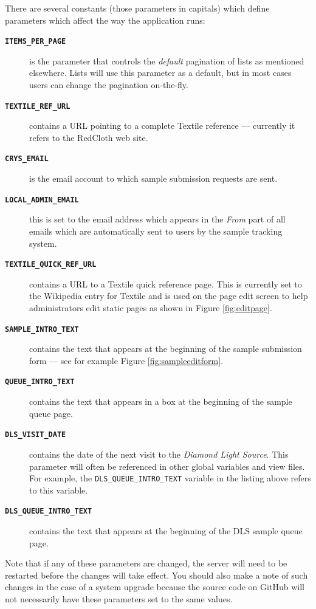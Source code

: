 \documentclass[12pt,twoside]{article}
\begin{document}
There are several constants (those parameters in capitals) which define
parameters which affect the way the application runs:
\begin{description}
\item[\texttt{\textbf{ITEMS\_PER\_PAGE}}]
is the parameter that controls the \emph{default} pagination of lists
as mentioned elsewhere. Lists will use this parameter as a default, but
in most cases users can change the pagination on-the-fly.
\item[\texttt{\textbf{TEXTILE\_REF\_URL}}]
contains a URL pointing to a complete Textile reference --- currently
it refers to the RedCloth web site.
\item[\texttt{\textbf{CRYS\_EMAIL}}]
is the email account to which sample submission requests are sent.
\item[\texttt{\textbf{LOCAL\_ADMIN\_EMAIL}}]
this is set to the email address which appears in the \emph{From}
part of all emails which are automatically sent to users by the sample
tracking system.
\item[\texttt{\textbf{TEXTILE\_QUICK\_REF\_URL}}]
contains a URL to a Textile quick reference page. This is currently set
to the Wikipedia entry for Textile and is used on the page edit screen
to help administrators edit static pages as shown in Figure \ref{fig:editpage}.
\item[\texttt{\textbf{SAMPLE\_INTRO\_TEXT}}]
contains the text that appears at the beginning of the sample
submission form --- see for example Figure \ref{fig:sampleeditform}. 
\item[\texttt{\textbf{QUEUE\_INTRO\_TEXT}}]
contains the text that appears in a box at the beginning of the sample
queue page.
\item[\texttt{\textbf{DLS\_VISIT\_DATE}}]
contains the date of the next visit to the \emph{Diamond Light Source}. This
parameter will often be referenced in other global variables and view files.
For example, the \verb=DLS_QUEUE_INTRO_TEXT= variable in the listing above
refers to this variable.
\item[\texttt{\textbf{DLS\_QUEUE\_INTRO\_TEXT}}]
contains the text that appears at the beginning of the DLS sample
queue page.
\end{description}

\begin{plainblock}
Note that if any of these parameters are changed, the server will need
to be restarted before the changes will take effect. You should also
make a note of such changes in the case of a system upgrade because
the source code on GitHub will not necessarily have these parameters
set to the same values.
\end{plainblock}
\end{document}
